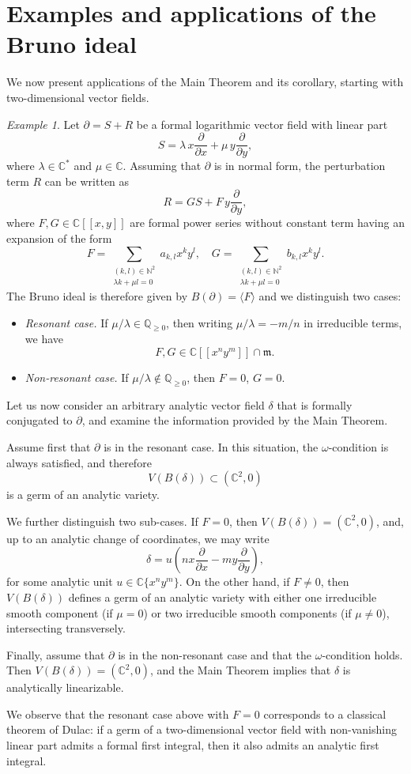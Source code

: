 \documentclass[10pt,twoside,reqno]{amsart}
\theoremstyle{remark}
\theoremstyle{remark}
\newtheorem{example}[thm]{Example}
\newcommand{\Q}{\mathbb{Q}}
\newcommand{\N}{\mathbb{N}}
\newcommand{\C}{\mathbb{C}}
\newcommand{\xx}{\frac{\partial}{\partial x}}
\newcommand{\yy}{\frac{\partial}{\partial y}}
\begin{document}
\section{Examples and applications of the Bruno ideal}\label{sec:examplesapplications}
We now present applications of the Main Theorem and its corollary, starting with two-dimensional vector fields.
\begin{example}
Let \(\partial = S + R\) be a formal logarithmic vector field with linear part
\[
S = \lambda\, x \xx + \mu\, y \yy,
\]
where \(\lambda \in \C^\ast\) and \(\mu \in \C\).
Assuming that \(\partial\) is in normal form, the perturbation term \(R\) can be written as
\[
R = GS + F \, y \yy,
\]
where \(F,G \in \C[[x,y]]\) are formal power series without constant term having an expansion of the form
\[
F = \sum_{\substack{(k,l)\in \N^2 \\ \lambda k + \mu l = 0}} a_{k,l} x^k y^l, \quad G = \sum_{\substack{(k,l)\in \N^2 \\ \lambda k + \mu l = 0}} b_{k,l} x^k y^l  .
\]
The Bruno ideal is therefore given by
$B(\partial) = \big\langle F \big\rangle$  and we distinguish two cases:

\begin{itemize}
\item \emph{Resonant case.}
If \(\mu/\lambda \in \Q_{\ge 0}\), then writing \(\mu/\lambda = -m/n\) in irreducible terms, we have
\[
F, G \in \C[[x^n y^m]] \cap \mathfrak{m}.
\]

\item \emph{Non-resonant case.}
If \(\mu/\lambda \notin \Q_{\ge 0}\), then \(F = 0\), \(G = 0\).
\end{itemize}

Let us now consider an arbitrary analytic vector field \(\delta\) that is formally conjugated to \(\partial\), and examine the information provided by the Main Theorem.

Assume first that \(\partial\) is in the resonant case. In this situation, the \(\omega\)-condition is always satisfied, and therefore
\[
V(B(\delta)) \subset (\C^2,0)
\]
is a germ of an analytic variety.

We further distinguish two sub-cases.  
If \(F = 0\), then \(V(B(\delta)) = (\C^2,0)\), and, up to an analytic change of coordinates, we may write
\[
\delta = u \left( n x \xx - m y \yy \right),
\]
for some analytic unit \(u \in \C\{x^n y^m\}\). On the other hand, if \(F \neq 0\), then \(V(B(\delta))\) defines a germ of an analytic variety with either one irreducible smooth component (if \(\mu = 0\)) or two irreducible smooth components (if \(\mu \neq 0\)), intersecting transversely.

Finally, assume that \(\partial\) is in the non-resonant case and that the \(\omega\)-condition holds. Then \(V(B(\delta)) = (\C^2,0)\), and the Main Theorem implies that \(\delta\) is analytically linearizable.
\end{example}
We observe that the resonant case above with $F=0$ corresponds to a classical theorem of Dulac: if a germ of a two-dimensional vector field with non-vanishing linear part admits a formal first integral, then it also admits an analytic first integral.
\end{document}
